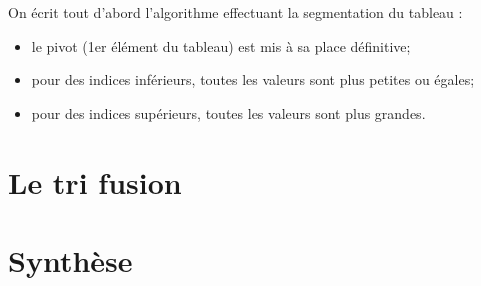 \documentclass[10pt,fleqn]{article} %
\begin{document}
On écrit tout d’abord l’algorithme effectuant la segmentation du tableau :
\begin{itemize}
\item le pivot (1er élément du tableau) est mis à sa place définitive;
\item pour des indices inférieurs, toutes les valeurs sont plus petites ou égales;
\item pour des indices supérieurs, toutes les valeurs sont plus grandes.
\end{itemize}

\section{Le tri fusion}

\section{Synthèse}

\begin{thebibliography}{2}

\end{thebibliography}
\end{document}
